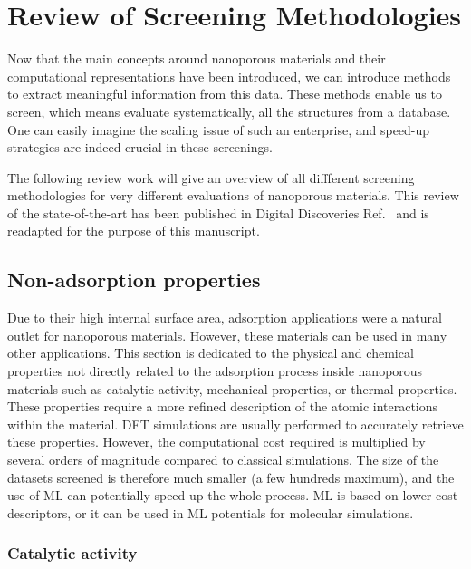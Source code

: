 \documentclass[main.tex]{subfiles}
\begin{document}
\section{Review of Screening Methodologies}

Now that the main concepts around nanoporous materials and their computational representations have been introduced, we can introduce methods to extract meaningful information from this data. These methods enable us to screen, which means evaluate systematically, all the structures from a database. One can easily imagine the scaling issue of such an enterprise, and speed-up strategies are indeed crucial in these screenings.

The following review work will give an overview of all diffferent screening methodologies for very different evaluations of nanoporous materials. This review of the state-of-the-art has been published in Digital Discoveries Ref.~\cite{Ren_2022} and is readapted for the purpose of this manuscript.

\subsection{Non-adsorption properties}

Due to their high internal surface area, adsorption applications were a natural outlet for nanoporous materials. However, these materials can be used in many other applications. This section is dedicated to the physical and chemical properties not directly related to the adsorption process inside nanoporous materials such as catalytic activity,\autocite{Singh_2015, Greeley_2006, Back_2020}
mechanical properties,\autocite{Chibani_2019, Gaillac_2020}
or thermal properties.\autocite{Toher_2014, Sarikurt_2020, Ducamp_2021} These properties require a more refined description of the atomic interactions within the material. DFT simulations are usually performed to accurately retrieve these properties. However, the computational cost required is multiplied by several orders of magnitude compared to classical simulations. The size of the datasets screened is therefore much smaller (a few hundreds maximum), and the use of ML can potentially speed up the whole process. ML is based on lower-cost descriptors,\autocite{Evans_2017, Ducamp_2022} or it can be used in ML potentials for molecular simulations\autocite{Eckhoff_2019,Friederich_2021}.

\subsubsection{Catalytic activity}
\end{document}
